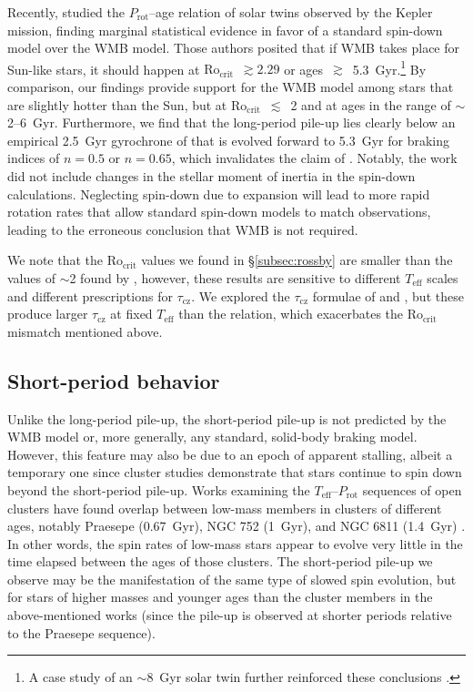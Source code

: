 \documentclass[linenumbers,tighten,trackchanges,twocolumn]{aastex631}
\newcommand{\taucz}{$\tau_\mathrm{cz}$\xspace}
\newcommand{\rocrit}{$\mathrm{Ro_{crit}}$\xspace}
\newcommand{\teff}{\ensuremath{T_{\mathrm{eff}}}\xspace}
\newcommand{\prot}{\ensuremath{P_\mathrm{rot}}\xspace}
\begin{document}
Recently, \citet{LorenzoOliveira2019} studied the \prot--age relation of solar twins observed by the Kepler mission, finding marginal statistical evidence in favor of a standard spin-down model over the WMB model. Those authors posited that if WMB takes place for Sun-like stars, it should happen at \rocrit~$\gtrsim 2.29$ or ages~$\gtrsim$~5.3~Gyr.\footnote{A case study of an $\sim$8~Gyr solar twin further reinforced these conclusions \citep{LorenzoOliveira2020}.} By comparison, our findings provide support for the WMB model among stars that are slightly hotter than the Sun, but at \rocrit~$\lesssim$~2 and at ages in the range of $\sim$2--6~Gyr. Furthermore, we find that the long-period pile-up lies clearly below an empirical 2.5~Gyr gyrochrone of \citet{Curtis2020} that is evolved forward to 5.3~Gyr for braking indices of $n=0.5$ or $n=0.65$, which invalidates the claim of \citet{LorenzoOliveira2019}. Notably, the \citet{LorenzoOliveira2019} work did not include changes in the stellar moment of inertia in the spin-down calculations. Neglecting spin-down due to expansion will lead to more rapid rotation rates that allow standard spin-down models to match observations, leading to the erroneous conclusion that WMB is not required.

We note that the \rocrit values we found in \S\ref{subsec:rossby} are smaller than the values of $\sim$2 found by \citet{vanSaders2016,vanSaders2019}, however, these results are sensitive to different \teff scales and different prescriptions for \taucz. We explored the \taucz formulae of \citet{BarnesKim2010} and \citet{Landin2010}, but these produce larger \taucz at fixed \teff than the \citet{Gunn1998} relation, which exacerbates the \rocrit mismatch mentioned above.


\subsection{Short-period behavior} \label{subsec:shortperiod}

Unlike the long-period pile-up, the short-period pile-up is not predicted by the WMB model or, more generally, any standard, solid-body braking model. However, this feature may also be due to an epoch of apparent stalling, albeit a temporary one since cluster studies demonstrate that stars continue to spin down beyond the short-period pile-up. Works examining the \teff–\prot sequences of open clusters have found overlap between low-mass members in clusters of different ages, notably Praesepe (0.67~Gyr), NGC 752 (1~Gyr), and NGC 6811 (1.4~Gyr) \citep{Agueros2018, Curtis2019a, Curtis2020}. In other words, the spin rates of low-mass stars appear to evolve very little in the time elapsed between the ages of those clusters. The short-period pile-up we observe may be the manifestation of the same type of slowed spin evolution, but for stars of higher masses and younger ages than the cluster members in the above-mentioned works (since the pile-up is observed at shorter periods relative to the Praesepe sequence). 
\end{document}
